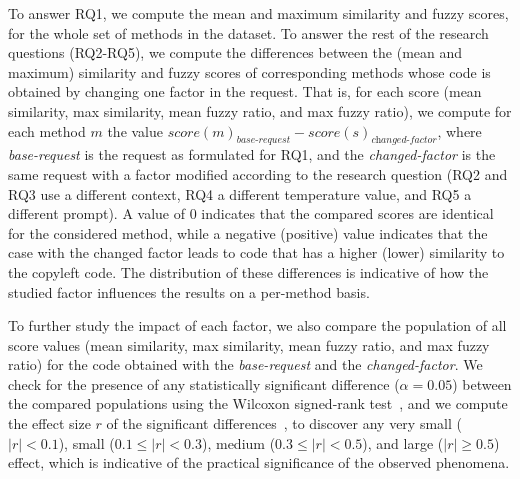 To answer RQ1, we compute the mean and maximum similarity and fuzzy scores, for the whole set of methods in the dataset. 
To answer the rest of the research questions (RQ2-RQ5), we compute the differences between the (mean and maximum) similarity and fuzzy scores of corresponding methods whose code is obtained by changing one factor in the request. That is, for each score (mean similarity, max similarity, mean fuzzy ratio, and max fuzzy ratio), we compute for each method $m$ the value $\textit{score}(m)_{\textit{base-request}}-\textit{score}(s)_{\textit{changed-factor}}$, where \textit{base-request} is the request as formulated for RQ1, and the \textit{changed-factor} is the same request with a factor modified according to the research question (RQ2 and RQ3 use a different context, RQ4 a different temperature value, and RQ5 a different prompt). 
A value of 0 indicates that the compared scores are identical for the considered method, while a negative (positive) value indicates that the case with the changed factor leads to code that has a higher (lower) similarity to the copyleft code. The distribution of these differences is indicative of how the studied factor influences the results on a per-method basis.

To further study the impact of each factor, we also compare the population of all score values (mean similarity, max similarity, mean fuzzy ratio, and max fuzzy ratio) for the code obtained with the \textit{base-request} and the \textit{changed-factor}.
We check for the presence of any statistically significant difference ($\alpha = 0.05$) between the compared populations using the Wilcoxon signed-rank test~\cite{test-wilcoxon}, and we compute the effect size $r$ of the significant differences~\cite{cohen2013statistical}, to discover any very small ($ |r| < 0.1 $), small ($ 0.1 \leq |r| < 0.3 $),  medium ($ 0.3 \leq  |r| < 0.5 $),  and large ($ |r| \geq 0.5 $) effect, which is indicative of the practical significance of the observed phenomena.  





